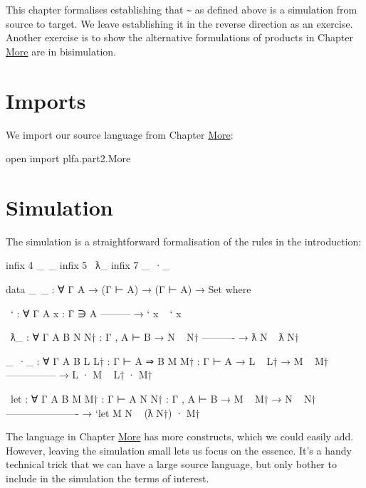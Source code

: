 This chapter formalises establishing that \texttt{\textasciitilde{}} as
defined above is a simulation from source to target. We leave
establishing it in the reverse direction as an exercise. Another
exercise is to show the alternative formulations of products in Chapter
\protect\hyperlink{More}{More} are in bisimulation.

\hypertarget{imports}{%
\section{Imports}\label{imports}}

We import our source language from Chapter
\protect\hyperlink{More}{More}:

\begin{fence}
\begin{code}
open import plfa.part2.More
\end{code}
\end{fence}

\hypertarget{simulation}{%
\section{Simulation}\label{simulation}}

The simulation is a straightforward formalisation of the rules in the
introduction:

\begin{fence}
\begin{code}
infix  4 _~_
infix  5 ~ƛ_
infix  7 _~·_

data _~_ : ∀ {Γ A} → (Γ ⊢ A) → (Γ ⊢ A) → Set where

  ~` : ∀ {Γ A} {x : Γ ∋ A}
     ---------
   → ` x ~ ` x

  ~ƛ_ : ∀ {Γ A B} {N N† : Γ , A ⊢ B}
    → N ~ N†
      ----------
    → ƛ N ~ ƛ N†

  _~·_ : ∀ {Γ A B} {L L† : Γ ⊢ A ⇒ B} {M M† : Γ ⊢ A}
    → L ~ L†
    → M ~ M†
      ---------------
    → L · M ~ L† · M†

  ~let : ∀ {Γ A B} {M M† : Γ ⊢ A} {N N† : Γ , A ⊢ B}
    → M ~ M†
    → N ~ N†
      ----------------------
    → `let M N ~ (ƛ N†) · M†
\end{code}
\end{fence}

The language in Chapter \protect\hyperlink{More}{More} has more
constructs, which we could easily add. However, leaving the simulation
small lets us focus on the essence. It's a handy technical trick that we
can have a large source language, but only bother to include in the
simulation the terms of interest.

